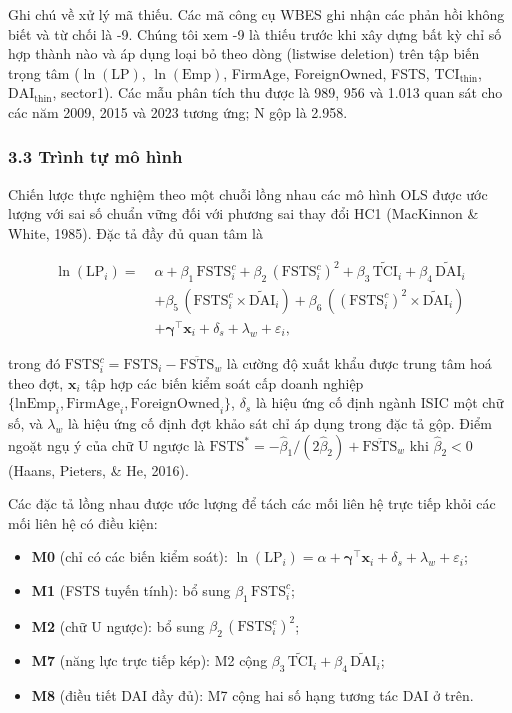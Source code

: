 \documentclass[12pt,a4paper]{article}
\providecommand{\tightlist}{\setlength{\itemsep}{0pt}\setlength{\parskip}{0pt}}
\begin{document}
Ghi chú về xử lý mã thiếu. Các mã công cụ WBES ghi nhận các phản hồi
không biết và từ chối là -9. Chúng tôi xem -9 là thiếu trước khi xây
dựng bất kỳ chỉ số hợp thành nào và áp dụng loại bỏ theo dòng (listwise
deletion) trên tập biến trọng tâm (\(\ln(\mathrm{LP})\),
\(\ln(\mathrm{Emp})\), FirmAge, ForeignOwned, FSTS,
\(\mathrm{TCI}_{\text{thin}}\), \(\mathrm{DAI}_{\text{thin}}\),
sector1). Các mẫu phân tích thu được là 989, 956 và 1.013 quan sát cho
các năm 2009, 2015 và 2023 tương ứng; N gộp là 2.958.

\hypertarget{33-truxecnh-tux1ef1-muxf4-huxecnh}{%
\subsubsection{3.3 Trình tự mô
hình}\label{33-truxecnh-tux1ef1-muxf4-huxecnh}}

Chiến lược thực nghiệm theo một chuỗi lồng nhau các mô hình OLS được ước
lượng với sai số chuẩn vững đối với phương sai thay đổi HC1 (MacKinnon
\& White, 1985). Đặc tả đầy đủ quan tâm là

\[
\begin{aligned}
\ln(\mathrm{LP}_i) =\;& \alpha + \beta_1\,\mathrm{FSTS}^{c}_i + \beta_2\,(\mathrm{FSTS}^{c}_i)^2 + \beta_3\,\tilde{\mathrm{TCI}}_i + \beta_4\,\tilde{\mathrm{DAI}}_i \\
& + \beta_5\,(\mathrm{FSTS}^{c}_i \times \tilde{\mathrm{DAI}}_i) + \beta_6\,((\mathrm{FSTS}^{c}_i)^2 \times \tilde{\mathrm{DAI}}_i) \\
& + \boldsymbol{\gamma}^{\top}\!\mathbf{x}_i + \delta_s + \lambda_w + \varepsilon_i,
\end{aligned}
\]

trong đó
\(\mathrm{FSTS}^{c}_i = \mathrm{FSTS}_i - \overline{\mathrm{FSTS}}_w\)
là cường độ xuất khẩu được trung tâm hoá theo đợt, \(\mathbf{x}_i\) tập
hợp các biến kiểm soát cấp doanh nghiệp
\(\{\mathrm{lnEmp}_i, \mathrm{FirmAge}_i, \mathrm{ForeignOwned}_i\}\),
\(\delta_s\) là hiệu ứng cố định ngành ISIC một chữ số, và \(\lambda_w\)
là hiệu ứng cố định đợt khảo sát chỉ áp dụng trong đặc tả gộp. Điểm
ngoặt ngụ ý của chữ U ngược là
\(\mathrm{FSTS}^{*} = -\hat\beta_1/(2\hat\beta_2) + \overline{\mathrm{FSTS}}_w\)
khi \(\hat\beta_2 < 0\) (Haans, Pieters, \& He, 2016).

Các đặc tả lồng nhau được ước lượng để tách các mối liên hệ trực tiếp
khỏi các mối liên hệ có điều kiện:

\begin{itemize}
\tightlist
\item
  \textbf{M0} (chỉ có các biến kiểm soát):
  \(\ln(\mathrm{LP}_i) = \alpha + \boldsymbol{\gamma}^{\top}\!\mathbf{x}_i + \delta_s + \lambda_w + \varepsilon_i\);
\item
  \textbf{M1} (FSTS tuyến tính): bổ sung
  \(\beta_1\,\mathrm{FSTS}^{c}_i\);
\item
  \textbf{M2} (chữ U ngược): bổ sung
  \(\beta_2\,(\mathrm{FSTS}^{c}_i)^2\);
\item
  \textbf{M7} (năng lực trực tiếp kép): M2 cộng
  \(\beta_3\,\tilde{\mathrm{TCI}}_i + \beta_4\,\tilde{\mathrm{DAI}}_i\);
\item
  \textbf{M8} (điều tiết DAI đầy đủ): M7 cộng hai số hạng tương tác DAI
  ở trên.
\end{itemize}
\end{document}
